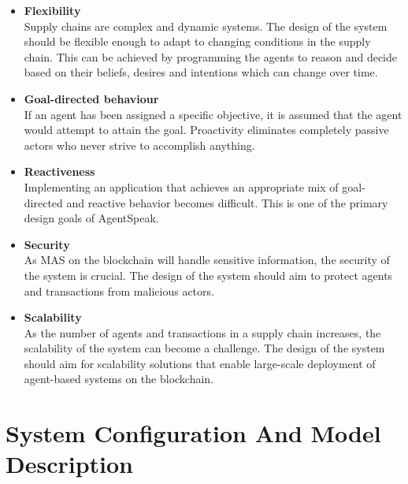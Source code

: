 \begin{itemize}
    \vspace{.5cm}
    
    \item \textbf{Flexibility} \\
    Supply chains are complex and dynamic systems. The design of the system should be flexible enough to adapt to changing conditions in the supply chain. This can be achieved by programming the agents to reason and decide based on their beliefs, desires and intentions which can change over time.
    
    \vspace{.5cm}
    
    \item \textbf{Goal-directed behaviour} \\
    If an agent has been assigned a specific objective, it is assumed that the agent would attempt to attain the goal. Proactivity eliminates completely passive actors who never strive to accomplish anything.

    \vspace{.5cm}
    
    \item \textbf{Reactiveness} \\
    Implementing an application that achieves an appropriate mix of goal-directed and reactive behavior becomes difficult. This is one of the primary design goals of AgentSpeak.
    
    \vspace{.5cm}
    
    \item \textbf{Security} \\
    As \ac{MAS} on the blockchain will handle sensitive information, the security of the system is crucial. The design of the system should aim to protect agents and transactions from malicious actors.

    \vspace{.5cm}
    
    \item \textbf{Scalability} \\ As the number of agents and transactions in a supply chain increases, the scalability of the system can become a challenge. The design of the system should aim for scalability solutions that enable large-scale deployment of agent-based systems on the blockchain.
\end{itemize}

\section{System Configuration And Model Description}

